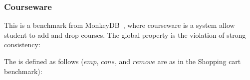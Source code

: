\newpage
\subsubsection*{Courseware} This is a benchmark from MonkeyDB~\cite{MonkeyDB}, where courseware is a system allow student to add and drop courses. The global property is the violation of strong consistency:
\vspace{-.35cm}\par{}
\vspace{-.4cm}\par\nobreak\noindent
The \tyName{} is defined as follows (\(\mathit{emp}\), \(\mathit{cons}\), and \(\mathit{remove}\) are as in the Shopping cart benchmark):

